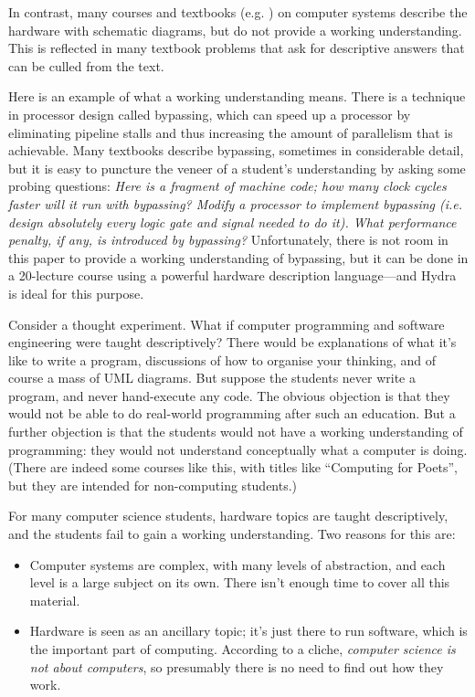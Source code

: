 \documentclass[submission,copyright,creativecommons]{eptcs}
\begin{document}
In contrast, many courses and textbooks
(e.g. \cite{PH1998-CompOrgDesHSInterface}) on computer systems
describe the hardware with schematic diagrams, but do not provide a
working understanding.  This is reflected in many textbook problems
that ask for descriptive answers that can be culled from the text.

Here is an example of what a working understanding means.  There is a
technique in processor design called bypassing, which can speed up a
processor by eliminating pipeline stalls and thus increasing the
amount of parallelism that is achievable.  Many textbooks describe
bypassing, sometimes in considerable detail, but it is easy to
puncture the veneer of a student's understanding by asking some
probing questions: \emph{Here is a fragment of machine code; how many
  clock cycles faster will it run with bypassing?  Modify a processor
  to implement bypassing (i.e. design absolutely every logic gate and
  signal needed to do it).  What performance penalty, if any, is
  introduced by bypassing?}  Unfortunately, there is not room in this
paper to provide a working understanding of bypassing, but it can be
done in a 20-lecture course using a powerful hardware description
language---and Hydra is ideal for this purpose.

Consider a thought experiment.  What if computer programming and
software engineering were taught descriptively?  There would be
explanations of what it's like to write a program, discussions of
how to organise your thinking, and of course a mass of UML
diagrams.  But suppose the students never write a program, and
never hand-execute any code.  The obvious objection is that they
would not be able to do real-world programming after such an
education.  But a further objection is that the students would not
have a working understanding of programming: they would not
understand conceptually what a computer is doing.  (There are
indeed some courses like this, with titles like ``Computing for
Poets'', but they are intended for non-computing students.)

For many computer science students, hardware topics are taught
descriptively, and the students fail to gain a working
understanding.  Two reasons for this are:

\begin{itemize}
\item Computer systems are complex, with many levels of
  abstraction, and each level is a large subject on its own.  There
  isn't enough time to cover all this material.
\item Hardware is seen as an ancillary topic; it's just there to
  run software, which is the important part of computing.
  According to a cliche, \emph{computer science is not about
    computers}, so presumably there is no need to find out how they
  work.
\end{itemize}
\end{document}
